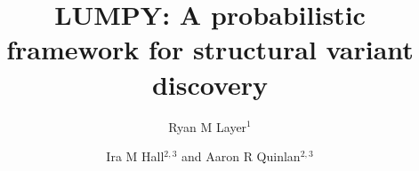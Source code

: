 \documentclass[10pt]{bmc_article}
\newenvironment{bmcformat}{\begin{raggedright}\baselineskip20pt\sloppy\setboolean{publ}{false}}{\end{raggedright}\baselineskip20pt\sloppy}
\begin{document}
\begin{bmcformat}

\title{LUMPY: A probabilistic framework for structural variant discovery}
\author{
Ryan M Layer$^1$\and
Ira M Hall\correspondingauthor$^{2,3}$
and
Aaron R Quinlan\correspondingauthor$^{2,3}$
}

\address{\iid(1)Department of Computer Science, University of Virginia,
Charlottesville, VA\\
\iid(2)Department of Biochemistry and Molecular Genetics,
University of Virginia, Charlottesville, VA\\
\iid(3)Department of Public Health Sciences and
Center for Public Health Genomics, University of Virginia, Charlottesville, VA
}


\maketitle
\begin{abstract}

\end{abstract}
\end{bmcformat}
\end{document}

